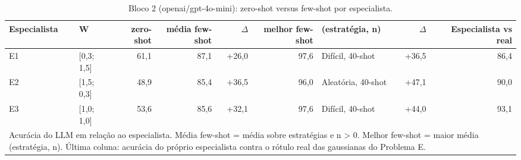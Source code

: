 \begin{table}[htbp]
\centering
\small
\caption{Bloco 2 (openai/gpt-4o-mini): zero-shot versus few-shot por especialista.}
\label{tab:bloco2_E_zero_vs_fewshot_por_especialista_gpt4mini}
\begin{tabular}{llrrrrlrr}
\toprule
Especialista & W & zero-shot & média few-shot & $\Delta$ & melhor few-shot & (estratégia, n) & $\Delta$ & Especialista vs real \\
\midrule
E1 & [0,3; 1,5] & 61,1 & 87,1 & +26,0 & 97,6 & Difícil, 40-shot & +36,5 & 86,4 \\
E2 & [1,5; 0,3] & 48,9 & 85,4 & +36,5 & 96,0 & Aleatória, 40-shot & +47,1 & 90,0 \\
E3 & [1,0; 1,0] & 53,6 & 85,6 & +32,1 & 97,6 & Difícil, 40-shot & +44,0 & 93,1 \\
\bottomrule
\multicolumn{9}{p{0.95\linewidth}}{\footnotesize Acurácia do LLM em relação ao especialista. Média few-shot = média sobre estratégias e n > 0. Melhor few-shot = maior média (estratégia, n). Última coluna: acurácia do próprio especialista contra o rótulo real das gaussianas do Problema E.} \\
\end{tabular}
\end{table}
